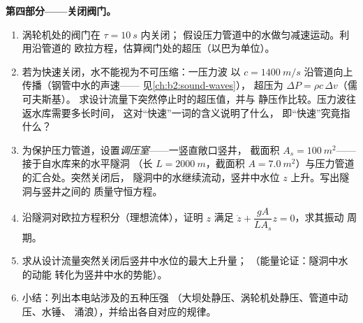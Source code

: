 \begin{problem}
\medskip
\noindent\textbf{第四部分——关闭阀门。}
\begin{enumerate}[resume]
  \item 涡轮机处的阀门在 $\tau = \qty{10}{s}$ 内关闭；
        假设压力管道中的水做匀减速运动。利用沿管道的
        欧拉方程，估算阀门处的超压（以巴为单位）。
  \item 若为快速关闭，水不能视为不可压缩：一压力波
        以 $c = \qty{1400}{m/s}$ 沿管道向上传播（钢管中水的声速——
        见\cref{ch:b2:sound-waves}），
        超压为 $\Delta P = \rho c\,\Delta v$（儒可夫斯基）。
        求设计流量下突然停止时的超压值，并与
        静压作比较。压力波往返水库需要多长时间，
        这对“快速”一词的含义说明了什么，
        即“快速”究竟指什么？
  \item 为保护压力管道，设置\emph{调压室}——一竖直敞口竖井，
        截面积 $A_s = \qty{100}{m^2}$——接于自水库来的水平隧洞
        （长 $L = \qty{2000}{m}$，截面积 $A =
        \qty{7.0}{m^2}$）与压力管道的汇合处。突然关闭后，
        隧洞中的水继续流动，竖井中水位
        $z$ 上升。写出隧洞与竖井之间的
        质量守恒方程。
  \item 沿隧洞对欧拉方程积分（理想流体），证明
        $z$ 满足 $\ddot z + \dfrac{gA}{LA_s}z = 0$，求其振动
        周期。
  \item 求从设计流量突然关闭后竖井中水位的最大上升量；
        （能量论证：隧洞中水的动能
        转化为竖井中水的势能）。
  \item 小结：列出本电站涉及的五种压强
        （大坝处静压、涡轮机处静压、管道中动压、水锤、
        涌浪），并给出各自对应的规律。
\end{enumerate}
\end{problem}
